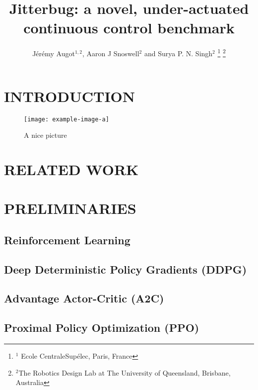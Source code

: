 \documentclass[letterpaper, 10 pt, conference]{ieeeconf}  %
\title{\LARGE \bf
Jitterbug: a novel, under-actuated continuous control benchmark
}
\author{
    J\'er\'emy Augot$^{1,2}$, Aaron J Snoswell$^{2}$ and Surya P. N. Singh$^{2}$
\thanks{
    $^{1}$ Ecole CentraleSup\'elec, Paris, France
}%
\thanks{
    $^{2}$The Robotics Design Lab at The University of Queensland, Brisbane, Australia
}%
}
\begin{document}
\maketitle
\thispagestyle{empty}
\pagestyle{empty}

\begin{abstract}

\lipsum[1]

\end{abstract}

\section{INTRODUCTION}

\lipsum[1]

\begin{figure}[t]
    \texttt{[image: example-image-a]}
    \caption{A nice picture}
    \label{fig:one}
\end{figure}

\section{RELATED WORK}

\lipsum[1]

\section{PRELIMINARIES}

\lipsum[1]

\subsection{Reinforcement Learning}

\subsection{Deep Deterministic Policy Gradients (DDPG)}

\subsection{Advantage Actor-Critic (A2C)}

\subsection{Proximal Policy Optimization (PPO)}
\end{document}
